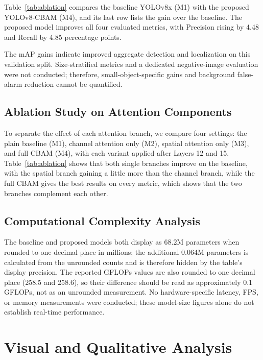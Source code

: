 \documentclass[conference]{IEEEtran}
\begin{document}
Table~\ref{tab:ablation} compares the baseline YOLOv8x (M1) with the proposed YOLOv8-CBAM (M4), and its last row lists the gain over the baseline. The proposed model improves all four evaluated metrics, with Precision rising by 4.48 and Recall by 4.85 percentage points.

The mAP gains indicate improved aggregate detection and localization on this validation split. Size-stratified metrics and a dedicated negative-image evaluation were not conducted; therefore, small-object-specific gains and background false-alarm reduction cannot be quantified.


\subsection{Ablation Study on Attention Components}

To separate the effect of each attention branch, we compare four settings: the plain baseline (M1), channel attention only (M2), spatial attention only (M3), and full CBAM (M4), with each variant applied after Layers 12 and 15. Table~\ref{tab:ablation} shows that both single branches improve on the baseline, with the spatial branch gaining a little more than the channel branch, while the full CBAM gives the best results on every metric, which shows that the two branches complement each other.

\subsection{Computational Complexity Analysis}

The baseline and proposed models both display as 68.2M parameters when rounded to one decimal place in millions; the additional 0.064M parameters is calculated from the unrounded counts and is therefore hidden by the table's display precision. The reported GFLOPs values are also rounded to one decimal place (258.5 and 258.6), so their difference should be read as approximately 0.1 GFLOPs, not as an unrounded measurement. No hardware-specific latency, FPS, or memory measurements were conducted; these model-size figures alone do not establish real-time performance.

\section{Visual and Qualitative Analysis}
\end{document}
